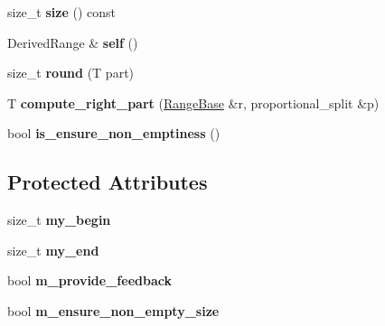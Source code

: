 \begin{DoxyCompactItemize}
\item 
\hypertarget{classtest__partitioner__utils_1_1RangeBase_aec5f5929ea00e654850b888a99f25dbb}{}size\+\_\+t {\bfseries size} () const \label{classtest__partitioner__utils_1_1RangeBase_aec5f5929ea00e654850b888a99f25dbb}

\item 
\hypertarget{classtest__partitioner__utils_1_1RangeBase_abd4feed70fab74070e03caf79fcd447e}{}Derived\+Range \& {\bfseries self} ()\label{classtest__partitioner__utils_1_1RangeBase_abd4feed70fab74070e03caf79fcd447e}

\item 
\hypertarget{classtest__partitioner__utils_1_1RangeBase_a57e0cbdfa70d940ba82ed8afce59031b}{}size\+\_\+t {\bfseries round} (T part)\label{classtest__partitioner__utils_1_1RangeBase_a57e0cbdfa70d940ba82ed8afce59031b}

\item 
\hypertarget{classtest__partitioner__utils_1_1RangeBase_ae03a696dc9cc0a42b1b46202baa55fa0}{}T {\bfseries compute\+\_\+right\+\_\+part} (\hyperlink{classtest__partitioner__utils_1_1RangeBase}{Range\+Base} \&r, proportional\+\_\+split \&p)\label{classtest__partitioner__utils_1_1RangeBase_ae03a696dc9cc0a42b1b46202baa55fa0}

\item 
\hypertarget{classtest__partitioner__utils_1_1RangeBase_afc0151a921dcee62ce44aad5e27d06fe}{}bool {\bfseries is\+\_\+ensure\+\_\+non\+\_\+emptiness} ()\label{classtest__partitioner__utils_1_1RangeBase_afc0151a921dcee62ce44aad5e27d06fe}

\end{DoxyCompactItemize}
\subsection*{Protected Attributes}
\begin{DoxyCompactItemize}
\item 
\hypertarget{classtest__partitioner__utils_1_1RangeBase_ab36afca1d9d50c3d709d1f6a86be780d}{}size\+\_\+t {\bfseries my\+\_\+begin}\label{classtest__partitioner__utils_1_1RangeBase_ab36afca1d9d50c3d709d1f6a86be780d}

\item 
\hypertarget{classtest__partitioner__utils_1_1RangeBase_aa06f7a287fd7aedf325cc3d90487b652}{}size\+\_\+t {\bfseries my\+\_\+end}\label{classtest__partitioner__utils_1_1RangeBase_aa06f7a287fd7aedf325cc3d90487b652}

\item 
\hypertarget{classtest__partitioner__utils_1_1RangeBase_ae463ec2b62d830610855cdaa377f95aa}{}bool {\bfseries m\+\_\+provide\+\_\+feedback}\label{classtest__partitioner__utils_1_1RangeBase_ae463ec2b62d830610855cdaa377f95aa}

\item 
\hypertarget{classtest__partitioner__utils_1_1RangeBase_a97e71e27f6d9340bf9c25e11e9b1c295}{}bool {\bfseries m\+\_\+ensure\+\_\+non\+\_\+empty\+\_\+size}\label{classtest__partitioner__utils_1_1RangeBase_a97e71e27f6d9340bf9c25e11e9b1c295}

\end{DoxyCompactItemize}



